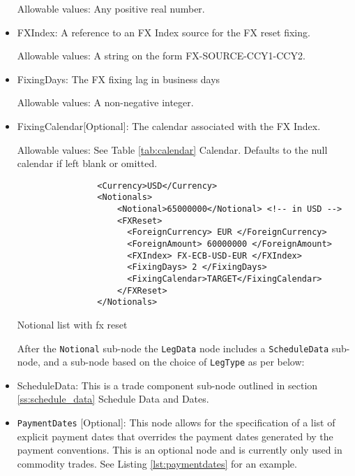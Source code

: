 \begin{itemize}
Allowable values:  Any positive real number.

\item FXIndex: A reference to an FX Index source for the FX reset fixing. 

Allowable values:  A string on the form FX-SOURCE-CCY1-CCY2.

\item FixingDays: The FX fixing lag in business days

Allowable values:  A non-negative integer.

\item FixingCalendar[Optional]: The calendar associated with the FX Index. 

Allowable values: See Table \ref{tab:calendar} Calendar. Defaults to the null calendar if left blank or omitted.



 \begin{listing}[H]
\begin{verbatim}
                <Currency>USD</Currency>
                <Notionals>
                    <Notional>65000000</Notional> <!-- in USD -->
                    <FXReset>
                      <ForeignCurrency> EUR </ForeignCurrency>
                      <ForeignAmount> 60000000 </ForeignAmount>
                      <FXIndex> FX-ECB-USD-EUR </FXIndex>
                      <FixingDays> 2 </FixingDays>
                      <FixingCalendar>TARGET</FixingCalendar>
                    </FXReset>
                </Notionals>
\end{verbatim}
\caption{Notional list with fx reset}
\label{lst:notional_fxreset}
\end{listing}


After the \lstinline!Notional! sub-node the \lstinline!LegData! node includes a \lstinline!ScheduleData! sub-node, and a sub-node based on the choice of \lstinline!LegType! as per below:

\item ScheduleData: This is a trade component sub-node outlined in section \ref{ss:schedule_data} Schedule Data and
Dates.
\item \lstinline!PaymentDates! [Optional]: This node allows for the specification of a list of explicit payment dates that overrides the payment dates generated by the payment conventions. This is an optional node and is currently only used in commodity trades.
See Listing \ref{lst:paymentdates} for an example. \break


\end{itemize}
